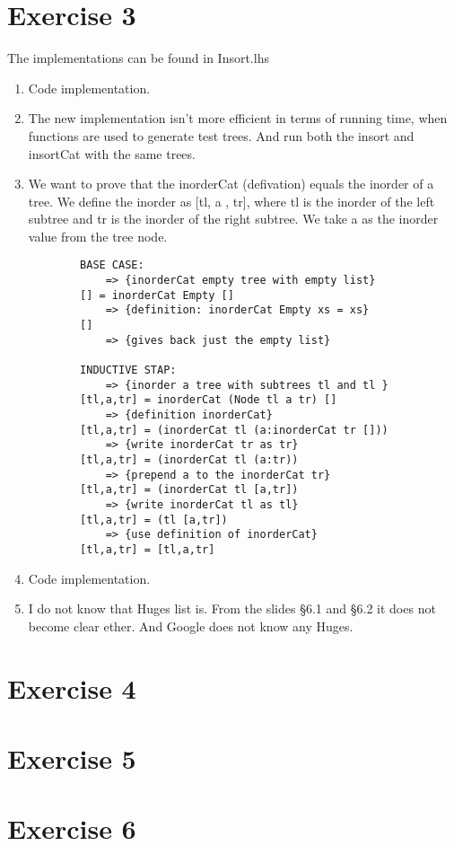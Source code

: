\documentclass{article}
\begin{document}
\section*{Exercise 3}
The implementations can be found in Insort.lhs\\
\begin{enumerate}
    \item Code implementation.
    \item The new implementation isn't more efficient in terms of running time, when functions are used to generate test trees. And run both the insort and insortCat with the same trees.
    \item We want to prove that the inorderCat (defivation) equals the inorder of a tree. We define the inorder as [tl, a , tr], where tl is the inorder of the left subtree and tr is the inorder of the right subtree. We take a as the inorder value from the tree node.
        \begin{verbatim}
        BASE CASE:
            => {inorderCat empty tree with empty list}
        [] = inorderCat Empty []
            => {definition: inorderCat Empty xs = xs}
        []
            => {gives back just the empty list}
        
        INDUCTIVE STAP:
            => {inorder a tree with subtrees tl and tl }
        [tl,a,tr] = inorderCat (Node tl a tr) []
            => {definition inorderCat}
        [tl,a,tr] = (inorderCat tl (a:inorderCat tr []))
            => {write inorderCat tr as tr}
        [tl,a,tr] = (inorderCat tl (a:tr))
            => {prepend a to the inorderCat tr}
        [tl,a,tr] = (inorderCat tl [a,tr])
            => {write inorderCat tl as tl}
        [tl,a,tr] = (tl [a,tr])
            => {use definition of inorderCat}
        [tl,a,tr] = [tl,a,tr]
        \end{verbatim}
    
    \item Code implementation. 
    \item I do not know that Huges list is. From the slides §6.1 and §6.2 it does not become clear ether. And Google does not know any Huges.
\end{enumerate}


\section*{Exercise 4}
%
%
%
%
\section*{Exercise 5}
\section*{Exercise 6}
\end{document}
